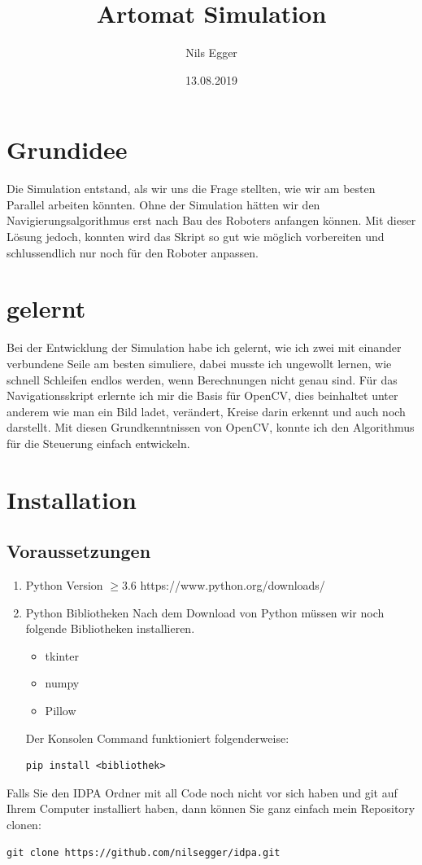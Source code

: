 \documentclass[12pt]{article}
\title{Artomat Simulation}
\author{Nils Egger}
\date{13.08.2019}
\begin{document}
\maketitle
\tableofcontents 

\section{Grundidee}

Die Simulation entstand, als wir uns die Frage stellten, wie wir am besten Parallel arbeiten könnten. Ohne der Simulation hätten wir den Navigierungsalgorithmus erst nach Bau des Roboters anfangen können. Mit dieser Lösung jedoch, konnten wird das Skript so gut wie möglich vorbereiten und schlussendlich nur noch für den Roboter anpassen.

\section{gelernt}
Bei der Entwicklung der Simulation habe ich gelernt, wie ich zwei mit einander verbundene Seile am besten simuliere, dabei musste ich ungewollt lernen, wie schnell Schleifen endlos werden, wenn Berechnungen nicht genau sind. Für das Navigationsskript erlernte ich mir die Basis für OpenCV, dies beinhaltet unter anderem wie man ein Bild ladet, verändert, Kreise darin erkennt und auch noch darstellt. Mit diesen Grundkenntnissen von OpenCV, konnte ich den Algorithmus für die Steuerung einfach entwickeln. 

\section{Installation}
\subsection{Voraussetzungen}
\begin{enumerate}
\item Python Version $\geq 3.6$\newline
https://www.python.org/downloads/
\item Python Bibliotheken \newline
Nach dem Download von Python müssen wir noch folgende Bibliotheken installieren. 
\begin{itemize}
	\item tkinter
	\item numpy
	\item Pillow
\end{itemize}
Der Konsolen Command funktioniert folgenderweise:
\begin{lstlisting}
pip install <bibliothek>
\end{lstlisting}
\end{enumerate}
Falls Sie den IDPA Ordner mit all Code noch nicht vor sich haben und git auf Ihrem Computer installiert haben, dann können Sie ganz einfach mein Repository clonen:
\begin{lstlisting}
git clone https://github.com/nilsegger/idpa.git
\end{lstlisting}
\end{document}
